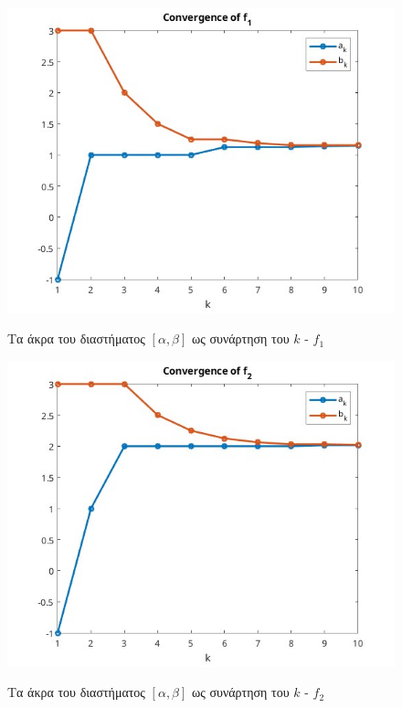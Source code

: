\begin{figure}[H]
    \includegraphics[scale=0.7]{plots/ex4/f1.jpg}
    \label{fig:funcs}
    \caption{Τα άκρα του διαστήματος $[\alpha, \beta]$ ως συνάρτηση του $k$ - $f_1$}
    \centering
\end{figure}

\begin{figure}[H]
    \includegraphics[scale=0.7]{plots/ex4/f2.jpg}
    \label{fig:funcs}
    \caption{Τα άκρα του διαστήματος $[\alpha, \beta]$ ως συνάρτηση του $k$ - $f_2$}
    \centering
\end{figure}

